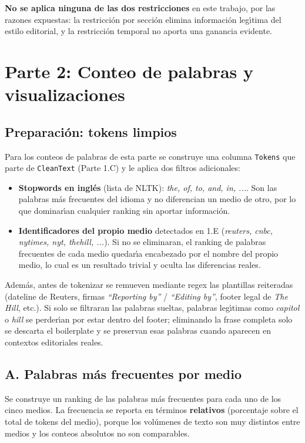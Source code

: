 \documentclass[11pt,a4paper]{article}
\begin{document}
\textbf{No se aplica ninguna de las dos restricciones} en este trabajo, por las razones expuestas: la restricci\'{o}n por secci\'{o}n elimina informaci\'{o}n leg\'{\i}tima del estilo editorial, y la restricci\'{o}n temporal no aporta una ganancia evidente.

\newpage
\section{Parte 2: Conteo de palabras y visualizaciones}

\subsection*{Preparaci\'{o}n: tokens limpios}

Para los conteos de palabras de esta parte se construye una columna \texttt{Tokens} que parte de \texttt{CleanText} (Parte 1.C) y le aplica dos filtros adicionales:
\begin{itemize}
    \item \textbf{Stopwords en ingl\'{e}s} (lista de NLTK): \textit{the, of, to, and, in, ...}. Son las palabras m\'{a}s frecuentes del idioma y no diferencian un medio de otro, por lo que dominar\'{\i}an cualquier ranking sin aportar informaci\'{o}n.
    \item \textbf{Identificadores del propio medio} detectados en 1.E (\textit{reuters, cnbc, nytimes, nyt, thehill, ...}). Si no se eliminaran, el ranking de palabras frecuentes de cada medio quedar\'{\i}a encabezado por el nombre del propio medio, lo cual es un resultado trivial y oculta las diferencias reales.
\end{itemize}

Adem\'{a}s, antes de tokenizar se remueven mediante regex las plantillas reiteradas (dateline de Reuters, firmas \textit{``Reporting by''} / \textit{``Editing by''}, footer legal de \textit{The Hill}, etc.). Si solo se filtraran las palabras sueltas, palabras leg\'{\i}timas como \textit{capitol} o \textit{hill} se perder\'{\i}an por estar dentro del footer; eliminando la frase completa solo se descarta el boilerplate y se preservan esas palabras cuando aparecen en contextos editoriales reales.

\subsection{A. Palabras m\'{a}s frecuentes por medio}

Se construye un ranking de las palabras m\'{a}s frecuentes para cada uno de los cinco medios. La frecuencia se reporta en t\'{e}rminos \textbf{relativos} (porcentaje sobre el total de tokens del medio), porque los vol\'{u}menes de texto son muy distintos entre medios y los conteos absolutos no son comparables.
\end{document}
